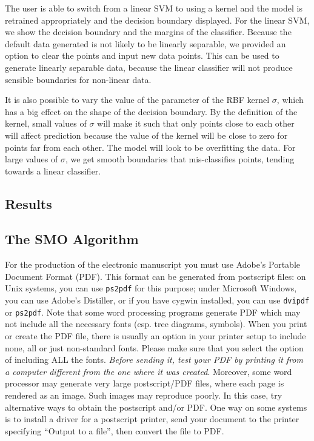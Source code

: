 \documentclass[11pt,letterpaper]{article}
\begin{document}
The user is able to switch from a linear SVM to using a kernel and the model is retrained appropriately and the decision boundary displayed. For the linear SVM, we show the decision boundary and the margins of the classifier. Because the default data generated is not likely to be linearly separable, we provided an option to clear the points and input new data points. This can be used to generate linearly separable data, because the linear classifier will not produce sensible boundaries for non-linear data.

It is also possible to vary the value of the parameter of the RBF kernel $\sigma$, which has a big effect on the shape of the decision boundary. By the definition of the kernel, small values of $\sigma$ will make it such that only points close to each other will affect prediction because the value of the kernel will be close to zero for points far from each other. The model will look to be overfitting the data. For large values of $\sigma$, we get smooth boundaries that mis-classifies points, tending towards a linear classifier.

\subsection{Results}


\subsection{The SMO Algorithm}
\label{sect:pdf}

For the production of the electronic manuscript you must use Adobe's
Portable Document Format (PDF). This format can be generated from
postscript files: on Unix systems, you can use {\tt ps2pdf} for this
purpose; under Microsoft Windows, you can use Adobe's Distiller, or
if you have cygwin installed, you can use {\tt dvipdf} or
{\tt ps2pdf}.  Note 
that some word processing programs generate PDF which may not include
all the necessary fonts (esp. tree diagrams, symbols). When you print
or create the PDF file, there is usually an option in your printer
setup to include none, all or just non-standard fonts.  Please make
sure that you select the option of including ALL the fonts.  {\em
  Before sending it, test your {\/\em PDF} by printing it from a
  computer different from the one where it was created}. Moreover,
some word processor may generate very large postscript/PDF files,
where each page is rendered as an image. Such images may reproduce
poorly.  In this case, try alternative ways to obtain the postscript
and/or PDF.  One way on some systems is to install a driver for a
postscript printer, send your document to the printer specifying
``Output to a file'', then convert the file to PDF.
\end{document}
